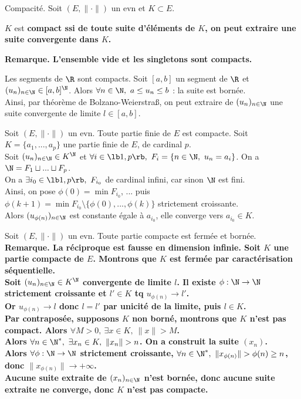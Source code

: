 \documentclass[11pt]{article}
\begin{document}
\begin{defi}{Compacité.}{}
    Soit $(E,\|\cdot\|)$ un evn et $K\subset E$.
    \begin{center}
        $K$ est \bf{compact} ssi de toute suite d'éléments de $K$, on peut extraire une suite convergente dans $K$.
    \end{center}
    \bf{Remarque.} L'ensemble vide et les singletons sont compacts.
\end{defi}

\begin{ex}{}{}
    Les segments de $\R$ sont compacts.
    \tcblower
    Soit $[a,b]$ un segment de $\R$ et $(u_n)_{n\in\N}\in[a,b]^\N$. Alors $\forall n \in \N, ~ a \leq u_n \leq b$ :  la suite est bornée.\\
    Ainsi, par théorème de Bolzano-Weierstraß, on peut extraire de $(u_n)_{n\in\N}$ une suite convergente de limite $l\in[a,b]$.  
\end{ex}

\begin{prop}{}{}
    Soit $(E,\|\cdot\|)$ un evn. Toute partie finie de $E$ est compacte.
    \tcblower
    Soit $K=\{a_1,...,a_p\}$ une partie finie de $E$, de cardinal $p$.\\
    Soit $(u_n)_{n\in\N}\in K^\N$ et $\forall i \in \lb1,p\rb, ~ F_i=\{n\in\N, ~ u_n = a_i\}$. On a $\N=F_1\sqcup...\sqcup F_p$.\\
    On a $\exists i_0 \in \lb1,p\rb, ~ F_{i_0}$ de cardinal infini, car sinon $\N$ est fini.\\
    Ainsi, on pose $\phi(0)=\min F_{i_0}$, ... puis $\phi(k+1)=\min F_{i_0} \setminus \{\phi(0),...,\phi(k)\}$ strictement croissante.\\
    Alors $(u_{\phi(n)})_{n\in\N}$ est constante égale à $a_{i_0}$, elle converge vers $a_{i_0}\in K$.
\end{prop}

\begin{prop}{}{}
    Soit $(E,\|\cdot\|)$ un evn. Toute partie compacte est fermée et bornée.\\
    \bf{Remarque.} La réciproque est fausse en dimension infinie.
    \tcblower
    Soit $K$ une partie compacte de $E$. Montrons que $K$ est fermée par caractérisation séquentielle.\\
    Soit $(u_n)_{n\in\N}\in K^\N$ convergente de limite $l$. Il existe $\phi:\N\to\N$ strictement croissante et $l'\in K$ tq $u_{\phi(n)}\to l'$.\\
    Or $u_{\phi(n)}\to l$ donc $l=l'$ par unicité de la limite, puis $l\in K$.\\
    Par contraposée, supposons $K$ non borné, montrons que $K$ n'est pas compact. Alors $\forall M > 0, ~ \exists x \in K, ~ \|x\|>M$.\\
    Alors $\forall n \in \N^*, ~ \exists x_n \in K, ~ \|x_n\|>n$. On a construit la suite $(x_n)$.\\
    Alors $\forall \phi : \N \to \N$ strictement croissante, $\forall n \in \N^*, ~ \|x_{\phi(n)}\|>\phi(n)\geq n$, donc $\|x_{\phi(n)} \| \to +\infty$.\\
    Aucune suite extraite de $(x_n)_{n\in\N}$ n'est bornée, donc aucune suite extraite ne converge, donc $K$ n'est pas compacte.
\end{prop}
\end{document}
